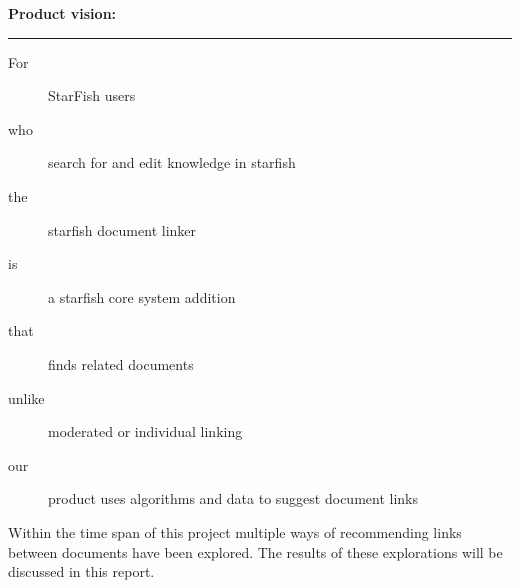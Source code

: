 \begin{shaded}
\textbf{{\large Product vision:}} \vspace{0.5\baselineskip} \hrule
	\begin{description}
 		\item[For] StarFish users
 		\item[who] search for and edit knowledge in starfish
 		\item[the] starfish document linker 
 		\item[is] a starfish core system addition
 		\item[that] finds related documents
 		\item[unlike] moderated or individual linking
 		\item[our] product uses algorithms and data to suggest document links 
	\end{description}
\end{shaded}


Within the time span of this project multiple ways of recommending links between documents have been explored. The results of these explorations will be discussed in this report. 